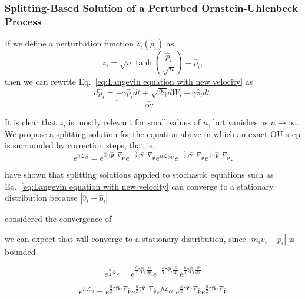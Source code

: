 \documentclass[
aip,
jcp,
reprint,
]{revtex4-1}
\newcommand{\vt}[1]{\boldsymbol{\mathbf{#1}}}          %
\newcommand{\diff}[2]{\frac{\partial #2}{\partial #1}} %
\newcommand{\timestep}{h}
\begin{document}
\subsubsection{Splitting-Based Solution of a Perturbed Ornstein-Uhlenbeck Process}

If we define a perturbation function $\hat{z}_i(\hat{p}_i)$ as
\begin{equation}
z_i = \sqrt{n} \tanh\left(\frac{\hat{p}_i}{\sqrt{n}}\right) - \hat{p}_i,
\end{equation}
then we can rewrite Eq.~\eqref{eq:Langevin equation with new velocity} as
\begin{equation}
\label{eq:Langevin equation with perturbed OU process}
d\hat{p}_i = \underbrace{- \gamma \hat{p}_i dt + \sqrt{2 \gamma} dW_i}_{OU} - \gamma \hat{z}_i dt.
\end{equation}

It is clear that $z_i$ is mostly relevant for small values of $n$, but vanishes as $n \to \infty$.
We propose a splitting solution for the equation above in which an exact OU step is surrounded by correction steps, that is,
\begin{equation*}
e^{\timestep \mathcal{L}_O} =
e^{\frac{\timestep}{2} \gamma \hat{\vt p} \cdot \nabla_{\hat{\vt p}}}
e^{-\frac{\timestep}{2} \gamma \hat{\vt v} \cdot \nabla_{\hat{\vt p}}}
e^{\timestep \mathcal{L}_\mathrm{OU}}
e^{-\frac{\timestep}{2} \gamma \hat{\vt v} \cdot \nabla_{\hat{\vt p}}}
e^{\frac{\timestep}{2} \gamma \hat{\vt p} \cdot \nabla_{\hat{\vt p}}}.
\end{equation*}


\citeauthor{Stoltz_2018} \cite{Stoltz_2018} have shown that splitting solutions applied to stochastic equations such as Eq.~\eqref{eq:Langevin equation with new velocity} can converge to a stationary distribution because $|\hat{v}_i - \hat{p}_i|$ 

\cite{Trstanova_2016}

considered the convergence of


we can expect that will converge to a stationary distribution, since $| m_i v_i - p_i |$ is bounded.


\begin{equation}
e^{\frac{\timestep}{2} \mathcal{L}_{Z}} =
e^{\frac{\timestep}{4} \gamma \hat{p}_i \diff{\hat{p}_i}{}}
e^{-\frac{\timestep}{2}  \gamma \hat{v}_i \diff{\hat{p}_i}{}}
e^{\frac{\timestep}{4} \gamma \hat{p}_i \diff{\hat{p}_i}{}}
\end{equation}

\begin{equation*}
e^{\timestep \mathcal{L}_O} =
e^{\frac{\timestep}{2} \gamma \hat{\vt p} \cdot \nabla_{\hat{\vt p}}}
e^{\frac{\timestep}{2} \gamma \hat{\vt v} \cdot \nabla_{\hat{\vt p}}}
e^{\timestep \mathcal{L}_\mathrm{OU}}
e^{\frac{\timestep}{2} \gamma \hat{\vt v} \cdot \nabla_{\hat{\vt p}}}
e^{\frac{\timestep}{2} \gamma \hat{\vt p} \cdot \nabla_{\hat{\vt p}}}
\end{equation*}
\end{document}
